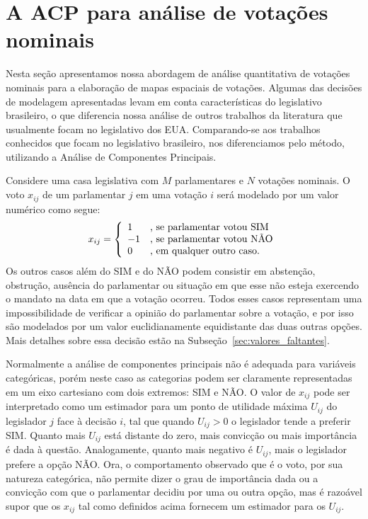 \documentclass[
	article,			%
	12pt,				%
    twoside,			%
	a4paper,			%
	english,			%
	french,				%
	spanish,			%
	brazil,				%
	]{abntex2}
\newcommand\nay{NÃO\xspace}
\newcommand\yea{SIM\xspace}
\begin{document}

\section{A ACP para análise de votações nominais}
\label{sec:acp}

Nesta seção apresentamos nossa abordagem de análise quantitativa de votações nominais para a elaboração de mapas espaciais de votações. Algumas das decisões de modelagem apresentadas levam em conta características do legislativo brasileiro, o que diferencia nossa análise de outros trabalhos da literatura que usualmente focam no legislativo dos EUA. Comparando-se aos trabalhos conhecidos que focam no legislativo brasileiro, nos diferenciamos pelo método, utilizando a Análise de Componentes Principais.

Considere uma casa legislativa com $M$ parlamentares e $N$ votações nominais. O voto $x_{ij}$ de um parlamentar $j$ em uma votação $i$ será modelado por um valor numérico como segue:
\[
   x_{ij} = \left\{ 
     \begin{array}{l l}
        1 & \text{, se parlamentar votou \yea} \\
       -1 & \text{, se parlamentar votou \nay} \\
        0 & \text{, em qualquer outro caso.} 
     \end{array} \right.
\]
Os outros casos além do \yea e do \nay podem consistir em abstenção, obstrução, ausência do parlamentar ou situação em que esse não esteja exercendo o mandato na data em que a votação ocorreu. Todos esses casos representam uma impossibilidade de verificar a opinião do parlamentar sobre a votação, e por isso são modelados por um valor euclidianamente equidistante das duas outras opções. Mais detalhes sobre essa decisão estão na Subseção~\ref{sec:valores_faltantes}.

Normalmente a análise de componentes principais não é adequada para variáveis categóricas, porém neste caso as categorias podem ser claramente representadas em um eixo cartesiano com dois extremos: SIM e NÃO. O valor de $x_{ij}$ pode ser interpretado como um estimador para um ponto de utilidade máxima $U_{ij}$ do legislador $j$ face à decisão $i$, tal que quando $U_{ij} > 0$ o legislador tende a preferir \yea. Quanto mais $U_{ij}$ está distante do zero, mais convicção ou mais importância é dada à questão. Analogamente, quanto mais negativo é $U_{ij}$, mais o legislador prefere a opção \nay. Ora, o comportamento observado que é o voto, por sua natureza categórica, não permite dizer o grau de importância dada ou a convicção com que o parlamentar decidiu por uma ou outra opção, mas é razoável supor que os $x_{ij}$ tal como definidos acima fornecem um estimador para os $U_{ij}$.
\end{document}
